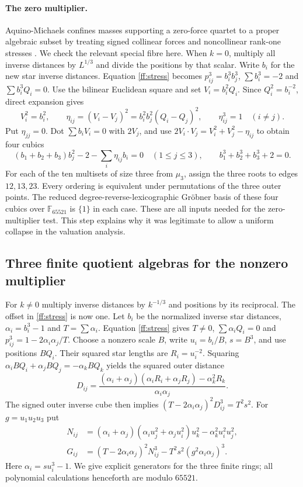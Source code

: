 \documentclass[11pt,letterpaper]{article}
\theoremstyle{definition}
\begin{document}
\paragraph{The zero multiplier.}
Aquino-Michaels confines masses supporting a zero-force quartet to a proper algebraic subset by treating signed collinear forces and noncollinear rank-one stresses \cite[Lemmas~5.3--5.5, Thm.~5.6]{Residual}. We check the relevant special fibre here.
When $k=0$, multiply all inverse distances by $L^{1/3}$ and divide
the positions by that scalar. Write $b_i$ for the new star inverse
distances. Equation \eqref{ff:stress} becomes
$p_{ij}^3=b_i^3b_j^3$, $\sum b_i^3=-2$ and
$\sum b_i^3Q_i=0$. Use the bilinear Euclidean square and set
$V_i=b_i^2Q_i$. Since $Q_i^2=b_i^{-2}$, direct expansion gives
\[
 V_i^2=b_i^2,\qquad
 \eta_{ij}=(V_i-V_j)^2=b_i^2 b_j^2(Q_i-Q_j)^2,\qquad
 \eta_{ij}^3=1\quad(i\ne j).
\]
Put $\eta_{jj}=0$. Dot $\sum b_i V_i=0$ with $2V_j$, and use
$2V_i\cdot V_j=V_i^2+V_j^2-\eta_{ij}$ to obtain four cubics
\[
 (b_1+b_2+b_3)b_j^2-2-\sum_i\eta_{ij}b_i=0\quad(1\le j\le3),
 \qquad b_1^3+b_2^3+b_3^3+2=0 .
\]
For each of the ten multisets of size three from $\mu_3$, assign
the three roots to edges $12,13,23$. Every ordering is equivalent
under permutations of the three outer points. The reduced
degree-reverse-lexicographic Gr\"obner basis of these four cubics over
$\mathbb F_{65521}$ is $\{1\}$ in each case. These are all inputs
needed for the zero-multiplier test. This step explains why it was
legitimate to allow a uniform collapse in the valuation analysis.

\subsection{Three finite quotient algebras for the nonzero multiplier}
\label{ff:charts}

For $k\ne0$ multiply inverse distances by $k^{-1/3}$ and positions
by its reciprocal. The offset in \eqref{ff:stress} is now one. Let
$b_i$ be the normalized inverse star distances, $\alpha_i=b_i^3-1$
and $T=\sum\alpha_i$. Equation \eqref{ff:stress} gives
$T\ne0$, $\sum\alpha_iQ_i=0$ and
$p_{ij}^3=1-2\alpha_i\alpha_j/T$. Choose a nonzero scale $B$,
write $u_i=b_i/B$, $s=B^3$, and use positions $BQ_i$. Their squared
star lengths are $R_i=u_i^{-2}$. Squaring
$\alpha_i BQ_i+\alpha_j BQ_j=-\alpha_k BQ_k$ yields the squared
outer distance
\begin{equation}
 D_{ij}=\frac{(\alpha_i+\alpha_j)(\alpha_i R_i+\alpha_j R_j)
             -\alpha_k^2R_k}{\alpha_i\alpha_j}.
 \label{ff:distance}
\end{equation}
The signed outer inverse cube then implies
$(T-2\alpha_i\alpha_j)^2D_{ij}^3=T^2 s^2$.
For $g=u_1u_2u_3$ put
\begin{align*}
 N_{ij}&=(\alpha_i+\alpha_j)(\alpha_i u_j^2+\alpha_j u_i^2)
            u_k^2-\alpha_k^2u_i^2u_j^2,\\
 G_{ij}&=(T-2\alpha_i\alpha_j)^2N_{ij}^3
                   -T^2s^2(g^2\alpha_i\alpha_j)^3 .
\end{align*}
Here $\alpha_i=s u_i^3-1$. We give explicit generators for the
three finite rings; all polynomial calculations henceforth are modulo
$65521$.
\end{document}
